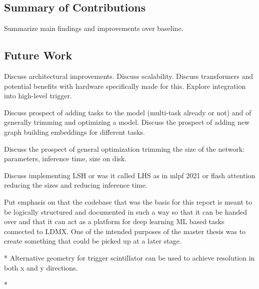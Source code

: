
\subsection{Summary of Contributions}
Summarize main findings and improvements over baseline.

\subsection{Future Work}
Discuss architectural improvements. Discuss scalability.
Discuss transformers and potential benefits with hardware specifically made for this. 
Explore integration into high-level trigger.

Discuss prospect of adding tasks to the model (multi-task already or not) and of generally trimming and optimizing a model. Discuss the prospect of adding new graph building embeddings for different tasks. 

Discuss the prospect of general optimization trimming the size of the network: parameters, inference time, size on disk. 

Discuss implementing LSH or was it called LHS as in mlpf 2021 or flash attention reducing the sizes and reducing inference time. 

Put emphasis on that the codebase that was the basis for this report is meant to be logically structured and documented in such a way so that it can be handed over and that it can act as a platform for deep learning ML based tasks connected to LDMX. One of the intended purposes of the master thesis was to create something that could be picked up at a later stage.

* Alternative geometry for trigger scintillator can be used to achieve resolution in both x and y directions. 

* 